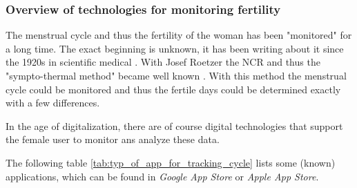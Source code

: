 \subsubsection{Overview of technologies for monitoring fertility}
The menstrual cycle and thus the fertility of the woman has been "monitored" for a long time. The exact beginning is unknown, it has been writing about it since the 1920s in scientific medical \cite{rotzer1988geschichte}. %
With Josef Roetzer the \ac{NCR} and thus the "sympto-thermal method" became well known \cite{roetzer1968erweiterte}. With this method the menstrual cycle could be monitored and thus the fertile days could be determined exactly with a few differences.

In the age of digitalization, there are of course digital technologies that support the female user to monitor ans analyze these data.

The following table \ref{tab:typ_of_app_for_tracking_cycle} lists some (known) applications, which can be found in \textit{Google App Store} or \textit{Apple App Store}.


